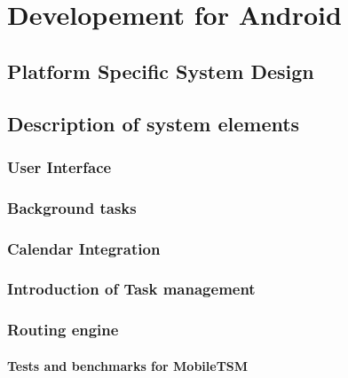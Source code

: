 \documentclass[11pt,a4paper]{scrreprt}
\begin{document}
\chapter{Developement for Android} %
\label{chp:android}
%

	\section{Platform Specific System Design} %
	\label{sec:android_desing}
	
	
	\section{Description of system elements} %
	
	\subsection{User Interface} %
	\label{sec:user_interface}
	
	
	\subsection{Background tasks} %
	\label{sec:android_integration}
	
	
	\subsection{Calendar Integration} %
	\label{sec:android_calendar}
	
	
	\subsection{Introduction of Task management} %
	\label{sec:android_task}
	
	
	\subsection{Routing engine} %
	\label{sub:routing_mobiletsm}
	

	\subsubsection{Tests and benchmarks for MobileTSM}
	\label{sub:routing_testcase}
	
	
\end{document}
